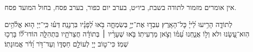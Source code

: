 \documentclass[twoside, openany, parskip=half, 11pt]{book}
\begin{document}
\begin{narrow}
\begin{scriptsize} %
\textsf{
אין אומרים מזמור לתודה בשבת, ביו״ט, בערב יום כפור, בערב פסח, בחול המועד פסח.\\
}\end{scriptsize}
 לְתוֹדָ֑ה
הָרִ֥יעוּ לַ֝ייָ֗ כׇּל־הָאָֽרֶץ׃
עִבְד֣וּ אֶת־יְיָ֣ בְּשִׂמְחָ֑ה בֹּ֥אוּ לְ֝פָנָ֗יו בִּרְנָנָֽה׃
דְּע֗וּ כִּֽי־יְיָ ה֤וּא אֱלֹ֫הִ֥ים הֽוּא־עָ֭שָׂנוּ ולא וְל֣וֹ אֲנַ֑חְנוּ עַ֝מּ֗וֹ וְצֹ֣אן מַרְעִיתֽוֹ׃
בֹּ֤אוּ שְׁעָרָ֨יו ׀ בְּתוֹדָ֗ה חֲצֵרֹתָ֥יו בִּתְהִלָּ֑ה הוֹדוּ־ל֗֝וֹ בָּרְכ֥וּ שְׁמֽוֹ׃
כִּי־ט֣וֹב יְיָ֭ לְעוֹלָ֣ם חַסְדּ֑וֹ וְעַד־דֹּ֥ר וָ֝דֹ֗ר אֱמוּנָתֽוֹ׃
\end{narrow}
\end{document}
